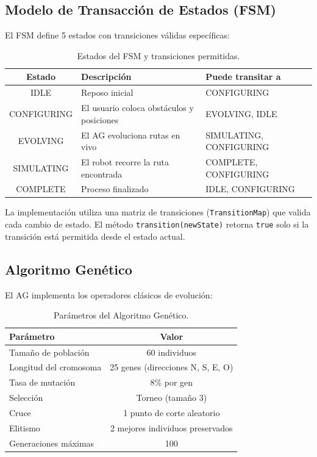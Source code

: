 \documentclass[12pt,a4paper]{article}
\begin{document}
\subsection{Modelo de Transacci\'on de Estados (FSM)}

El FSM define 5 estados con transiciones v\'alidas espec\'ificas:

\begin{table}[H]
\centering
\caption{Estados del FSM y transiciones permitidas.}
\label{tab:fsm}
\small
\begin{tabular}{c p{5cm} p{3.5cm}}
\toprule
\textbf{Estado} & \textbf{Descripci\'on} & \textbf{Puede transitar a} \\
\midrule
IDLE & Reposo inicial & CONFIGURING \\
CONFIGURING & El usuario coloca obst\'aculos y posiciones & EVOLVING, IDLE \\
EVOLVING & El AG evoluciona rutas en vivo & SIMULATING, CONFIGURING \\
SIMULATING & El robot recorre la ruta encontrada & COMPLETE, CONFIGURING \\
COMPLETE & Proceso finalizado & IDLE, CONFIGURING \\
\bottomrule
\end{tabular}
\end{table}

La implementaci\'on utiliza una matriz de transiciones (\texttt{TransitionMap}) que valida cada cambio de estado. El m\'etodo \texttt{transition(newState)} retorna \texttt{true} solo si la transici\'on est\'a permitida desde el estado actual.

\subsection{Algoritmo Gen\'etico}

El AG implementa los operadores cl\'asicos de evoluci\'on:

\begin{table}[H]
\centering
\caption{Par\'ametros del Algoritmo Gen\'etico.}
\label{tab:ga}
\begin{tabular}{l c}
\toprule
\textbf{Par\'ametro} & \textbf{Valor} \\
\midrule
Tama\~no de poblaci\'on & 60 individuos \\
Longitud del cromosoma & 25 genes (direcciones N, S, E, O) \\
Tasa de mutaci\'on & 8\% por gen \\
Selecci\'on & Torneo (tama\~no 3) \\
Cruce & 1 punto de corte aleatorio \\
Elitismo & 2 mejores individuos preservados \\
Generaciones m\'aximas & 100 \\
\bottomrule
\end{tabular}
\end{table}
\end{document}
